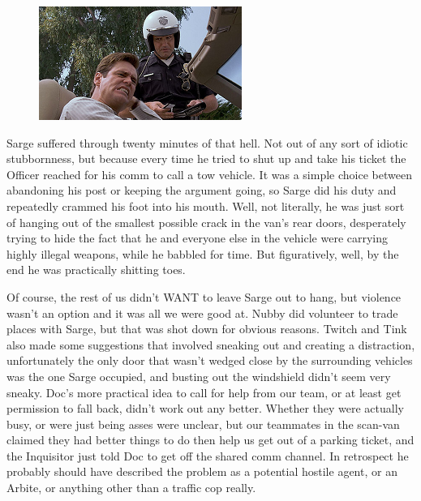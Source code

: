 \begin{figure}
	\begin{center}
		\includegraphics[width=\figwidth]{pics/17/39.png}
	\end{center}
\end{figure}
Sarge suffered through twenty minutes of that hell. 
Not out of any sort of idiotic stubbornness, but because every time he tried to shut up and take his ticket the Officer reached for his comm to call a tow vehicle. 
It was a simple choice between abandoning his post or keeping the argument going, so Sarge did his duty and repeatedly crammed his foot into his mouth. 
Well, not literally, he was just sort of hanging out of the smallest possible crack in the van's rear doors, desperately trying to hide the fact that he and everyone else in the vehicle were carrying highly illegal weapons, while he babbled for time. 
But figuratively, well, by the end he was practically shitting toes.

Of course, the rest of us didn't WANT to leave Sarge out to hang, but violence wasn't an option and it was all we were good at. 
Nubby did volunteer to trade places with Sarge, but that was shot down for obvious reasons. 
Twitch and Tink also made some suggestions that involved sneaking out and creating a distraction, unfortunately the only door that wasn't wedged close by the surrounding vehicles was the one Sarge occupied, and busting out the windshield didn't seem very sneaky. 
Doc's more practical idea to call for help from our team, or at least get permission to fall back, didn't work out any better. 
Whether they were actually busy, or were just being asses were unclear, but our teammates in the scan-van claimed they had better things to do then help us get out of a parking ticket, and the Inquisitor just told Doc to get off the shared comm channel. 
In retrospect he probably should have described the problem as a potential hostile agent, or an Arbite, or anything other than a traffic cop really.


